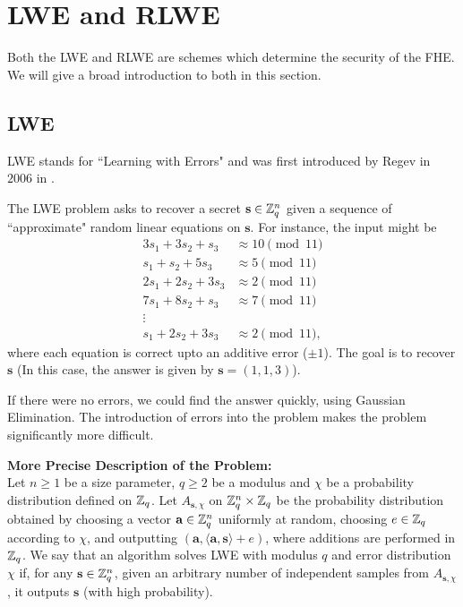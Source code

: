\documentclass[12pt]{article}
\theoremstyle{plain}
\theoremstyle{definition}
\theoremstyle{remark}
\begin{document}
\section{LWE and RLWE}
Both the LWE and RLWE are schemes which determine the security of the FHE. We will give a broad introduction to both in this section. 
\subsection{LWE}
LWE stands for ``Learning with Errors" and was first introduced by Regev in $2006$ in \cite{LWE}. 

The LWE problem asks to recover a secret $\mathbf{s} \in \mathbb{Z}_q^n$ given a sequence of ``approximate"
random linear equations on $\mathbf{s}$. For instance, the input might be
\begin{align*}
3s_1 + 3s_2 + s_3 & \approx 10 \pmod{11}\\
s_1 + s_2 + 5s_3  & \approx 5 \pmod{11}\\
2s_1 + 2s_2 + 3s_3 & \approx 2 \pmod{11} \\
7s_1 + 8s_2 + s_3 & \approx 7 \pmod{11} \\
\vdots \\
s_1 + 2s_2 + 3s_3 & \approx 2 \pmod{11},
\end{align*}
where each equation is correct upto an additive error ($\pm 1$). The goal is to recover $\mathbf{s}$ (In this case, the answer is given by $\mathbf{s}=(1,1,3)$).

If there were no errors, we could find the answer quickly, using Gaussian Elimination. The introduction of errors into the problem makes the problem significantly more difficult. 

\bigskip
\noindent
{\bf More Precise Description of the Problem:}
\\
Let $n\geq 1$ be a size parameter, $q\geq 2$ be a modulus and $\mathcal{\chi}$ be a probability distribution defined on $\mathbb{Z}_q$. Let $A_{\mathbf{s},\mathcal{\chi}}$ on $\mathbb{Z}_q^n\times  \mathbb{Z}_q$ be the probability distribution
obtained by choosing a vector $\mathbf{a} \in \mathbb{Z}_q^n$
uniformly at random, choosing $e \in \mathbb{Z}_q$ according to $\mathcal{\chi}$, and outputting $(\mathbf{a},\langle \mathbf{a},\mathbf{s}\rangle + e)$, where additions are performed in $\mathbb{Z}_q$. We say that
an algorithm solves LWE with modulus $q$ and error distribution $\mathcal{\chi}$ if, for any $\mathbf{s} \in \mathbb{Z}_q^n$, given an
arbitrary number of independent samples from $A_{\mathbf{s},\mathcal{\chi}}$, it outputs $\mathbf{s}$ (with high probability).
\end{document}
